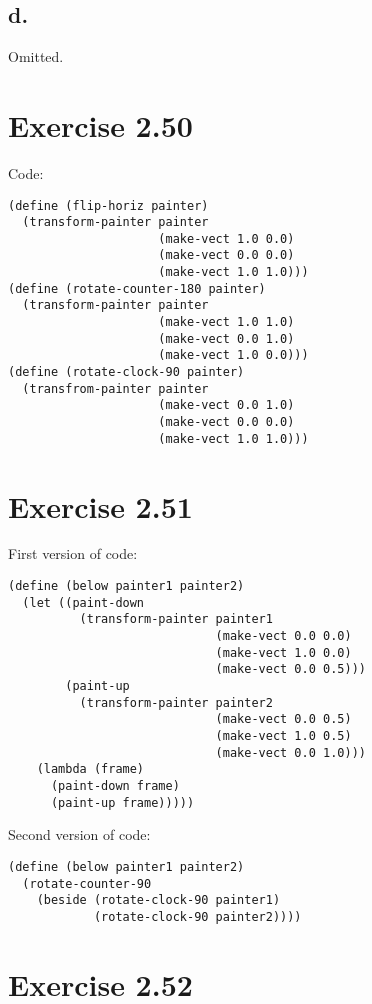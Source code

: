 \documentclass[../main.tex]{subfiles}
\begin{document}
\subsection{d.}

Omitted.

\section{Exercise 2.50}

Code:

\begin{lstlisting}
(define (flip-horiz painter)
  (transform-painter painter
                     (make-vect 1.0 0.0)
                     (make-vect 0.0 0.0)
                     (make-vect 1.0 1.0)))
(define (rotate-counter-180 painter)
  (transform-painter painter
                     (make-vect 1.0 1.0)
                     (make-vect 0.0 1.0)
                     (make-vect 1.0 0.0)))
(define (rotate-clock-90 painter)
  (transfrom-painter painter
                     (make-vect 0.0 1.0)
                     (make-vect 0.0 0.0)
                     (make-vect 1.0 1.0)))
\end{lstlisting}

\section{Exercise 2.51}

First version of code:

\begin{lstlisting}
(define (below painter1 painter2)
  (let ((paint-down
          (transform-painter painter1
                             (make-vect 0.0 0.0)
                             (make-vect 1.0 0.0)
                             (make-vect 0.0 0.5)))
        (paint-up
          (transform-painter painter2
                             (make-vect 0.0 0.5)
                             (make-vect 1.0 0.5)
                             (make-vect 0.0 1.0)))
    (lambda (frame)
      (paint-down frame)
      (paint-up frame)))))
\end{lstlisting}

Second version of code:

\begin{lstlisting}
(define (below painter1 painter2)
  (rotate-counter-90
    (beside (rotate-clock-90 painter1)
            (rotate-clock-90 painter2))))
\end{lstlisting}

\section{Exercise 2.52}
\end{document}
